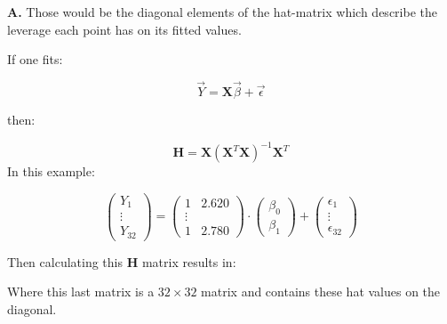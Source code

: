 \documentclass[]{book}
\newenvironment{Shaded}{\begin{snugshade}}{\end{snugshade}}
\newcommand{\DataTypeTok}[1]{\textcolor[rgb]{0.13,0.29,0.53}{#1}}
\newcommand{\DecValTok}[1]{\textcolor[rgb]{0.00,0.00,0.81}{#1}}
\newcommand{\KeywordTok}[1]{\textcolor[rgb]{0.13,0.29,0.53}{\textbf{#1}}}
\newcommand{\NormalTok}[1]{#1}
\newcommand{\OperatorTok}[1]{\textcolor[rgb]{0.81,0.36,0.00}{\textbf{#1}}}
\newcommand{\StringTok}[1]{\textcolor[rgb]{0.31,0.60,0.02}{#1}}
\begin{document}
\textbf{A.} Those would be the diagonal elements of the hat-matrix which describe the leverage each point has on its fitted values.

If one fits:

\[\vec{Y} = \mathbf{X} \vec {\beta} + \vec {\epsilon}\]

then:

\[\mathbf{H} = \mathbf{X}(\mathbf{X}^T\mathbf{X})^{-1}\mathbf{X}^T\]
In this example:

\[
\begin{pmatrix}Y_1\\
\vdots\\
Y_{32}\end{pmatrix} = \begin{pmatrix}
1 & 2.620\\
\vdots\\
1 & 2.780
\end{pmatrix} \cdot \begin{pmatrix}
\beta_0\\
\beta_1
\end{pmatrix} + \begin{pmatrix}\epsilon_1\\
\vdots\\
\epsilon_{32}\end{pmatrix}
\]

Then calculating this \(\mathbf{H}\) matrix results in:

\begin{Shaded}
\end{Shaded}

Where this last matrix is a \(32 \times 32\) matrix and contains these hat values on the diagonal.
\end{document}
